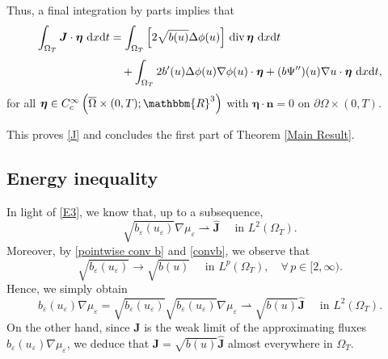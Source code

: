 \documentclass[11pt,  reqno]{amsart}%
\theoremstyle{plain}
\theoremstyle{definition}
\theoremstyle{remark}
\numberwithin{equation}{section}
\newcommand{\ve}{\varepsilon}
\def\div{\,\mathrm{div}}
\newcommand{\dx}{\textup{d}x}
\newcommand{\dt}{\textup{d}t}
\begin{document}
Thus, a final integration by parts implies that
\begin{align*}
\int_{\Omega_T} \boldsymbol{J} \cdot \boldsymbol{\eta} \ \dx \dt &= \int_{\Omega_T} \left[2\sqrt{b(u)}\Delta \phi(u) \right]\div\,  \boldsymbol{\eta} \ \dx \dt  \notag 
\\[3pt]
& \quad + \int_{\Omega_T} 2 b'(u) \Delta \phi(u)\nabla \phi(u) \cdot \boldsymbol{\eta} 
+ (b\Psi'')(u) \nabla u \cdot \boldsymbol{\eta} \ \dx \dt, 
\end{align*}
for all $\boldsymbol{\eta} \in C_c^\infty\left( \overline{\Omega}\times (0,T); \mathbbm{R}^3\right)$ with $\boldsymbol{\eta} \cdot \mathbf{n}=0$ on $\partial \Omega \times(0,T)$.

This proves \eqref{J} and concludes the first part of Theorem \ref{Main Result}. 

\subsection{Energy inequality}  
In light of \eqref{E3}, we know that, up to a subsequence, 
\begin{equation}
\label{J hat}
\sqrt{ b_{\ve}(u_{\ve}) }\nabla \mu_{\ve} \rightharpoonup  \widehat{\boldsymbol{J}} \quad \textrm{ in }L^2(\Omega_T).
\end{equation}
Moreover, by \eqref{pointwise conv b} and \eqref{convb}, we observe that
$$
\sqrt{ b_{\ve}(u_{\ve}) } \to \sqrt{b(u)} \quad  \textrm{ in }L^p(\Omega_T), \quad \forall \, p\in [2,\infty).
$$
Hence, we simply obtain
$$
b_\ve (u_\ve) \nabla \mu_\ve= \sqrt{b_\ve(u_\ve)}\sqrt{b_\ve(u_\ve)}\nabla \mu_\ve 
 \rightharpoonup  \sqrt{b(u)} \widehat{\boldsymbol{J}} \quad \textrm{ in }L^2(\Omega_T).
$$
On the other hand, since $\boldsymbol{J}$ is the weak limit of the approximating fluxes $b_\ve (u_\ve) \nabla \mu_\ve$, we deduce that 
$\boldsymbol{J}= \sqrt{b(u)} \widehat{\boldsymbol{J}}$ almost everywhere in $\Omega_T$.
\end{document}
